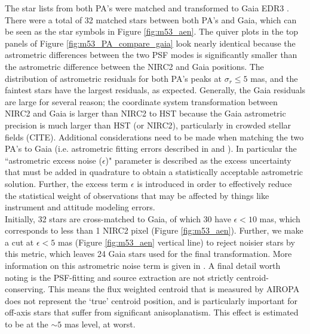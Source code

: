 \documentclass[]{spie}  %
\begin{document}
\indent The star lists from both PA's were matched and transformed to Gaia EDR3 \cite{brown:2021a}. There were a total of 32 matched stars between both PA's and Gaia, which can be seen as the star symbols in Figure \ref{fig:m53_aen}. The quiver plots in the top panels of Figure \ref{fig:m53_PA_compare_gaia} look nearly identical because the astrometric differences between the two PSF modes is significantly smaller than the astrometric difference between the NIRC2 and Gaia positions. The distribution of astrometric residuals for both PA's peaks at $\sigma_{r}\leq5$ mas, and the faintest stars have the largest residuals, as expected. Generally, the Gaia residuals are large for several reason; the coordinate system transformation between NIRC2 and Gaia is larger than NIRC2 to HST because the Gaia astrometric precision is much larger than HST (or NIRC2), particularly in crowded stellar fields (CITE). Additional considerations need to be made when matching the two PA's to Gaia (i.e. astrometric fitting errors described in \cite{brown:2018a} and \cite{brown:2021a}). In particular the ``astrometric excess noise ($\epsilon$)" parameter is described as the excess uncertainty that must be added in quadrature to obtain a statistically acceptable astrometric solution. Further, the excess term $\epsilon$ is introduced in order to effectively reduce the statistical weight of observations that may be affected by things like instrument and attitude modeling errors.
\\
\indent Initially, 32 stars are cross-matched to Gaia, of which 30 have $\epsilon <  10$ mas, which corresponds to less than 1 NIRC2 pixel (Figure \ref{fig:m53_aen}). Further, we make a cut at $\epsilon <  5$ mas (Figure \ref{fig:m53_aen} vertical line) to reject noisier stars by this metric, which leaves 24 Gaia stars used for the final transformation. More information on this astrometric noise term is given in \cite{lindegren:2012a}. A final detail worth noting is the PSF-fitting and source extraction are not strictly centroid-conserving. This means the flux weighted centroid that is measured by AIROPA does not represent the `true' centroid position, and is particularly important for off-axis stars that suffer from significant anisoplanatism. This effect is estimated to be at the ${\sim}5$ mas level, at worst.
\end{document}
